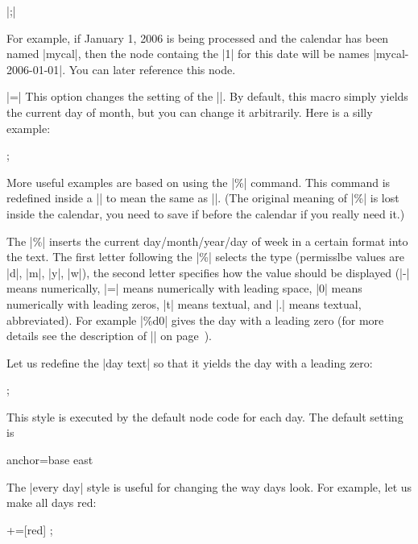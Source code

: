 \begin{command}{\calendar {}|;|}
\begin{itemize}
    For example, if January 1, 2006 is being processed and the
    calendar has been named |mycal|, then the node containg the |1|
    for this date will be names |mycal-2006-01-01|. You can later
    reference this node.
\begin{codeexample}[]
\end{codeexample}

    |=|
    This option changes the setting of the |\tikzdaytext|. By default,
    this macro simply yields the current day of month, but you can
    change it arbitrarily. Here is a silly example:
\begin{codeexample}[]
\tikz \calendar[dates=2000-01-01 to 2000-01-31,week list,
                day text=x];  
\end{codeexample}
    More useful examples are based on using the |\%| command. This
    command is redefined inside a |\pgfcalendar| to mean the same as
    |\pgfcalendarshorthand|. (The original meaning of |\%| is lost
    inside the calendar, you need to save if before the calendar if
    you really need it.)

    The |\%| inserts the current day/month/year/day of week in a
    certain format into the text. The first letter following the |\%|
    selects the type (permisslbe values are |d|, |m|, |y|, |w|), the
    second letter specifies how the value should be displayed (|-|
    means numerically, |=| means numerically with leading
    space, |0| means numerically with leading zeros, |t| means
    textual, and |.| means textual, abbreviated). For example |\%d0|
    gives the day with a leading zero (for more details see
    the description of |\pgfcalendarshorthand| on
    page~\pageref{pgfcalendarshorthand}).

    Let us redefine the |day text| so that it yields the day with a
    leading zero:
\begin{codeexample}
\tikz \calendar[dates=2000-01-01 to 2000-01-31,week list,
                day text=\%d0];  
\end{codeexample}
    This style is executed by the default node code for each day. The
    default setting is
\begin{codeexample}
anchor=base east
\end{codeexample}
    The |every day| style is useful for changing the way days
    look. For example, let us make all days red:
\begin{codeexample}
+=[red]
\tikz \calendar[dates=2000-01-01 to 2000-01-31,week list];
\end{codeexample}
  \end{itemize}


\end{command}
